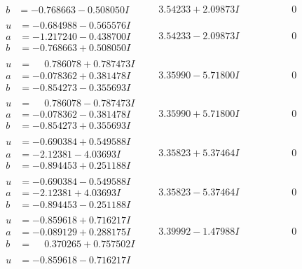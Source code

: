 \documentclass[1p]{elsarticle_modified}
\theoremstyle{definition}
\begin{document}
$$\begin{array}{c|c|c}
\begin{aligned}
b &= -0.768663 - 0.508050 I\end{aligned}
 & \phantom{-}3.54233 + 2.09873 I & \phantom{-0.000000 } 0 \\ \hline\begin{aligned}
u &= -0.684988 - 0.565576 I \\
a &= -1.217240 - 0.438700 I \\
b &= -0.768663 + 0.508050 I\end{aligned}
 & \phantom{-}3.54233 - 2.09873 I & \phantom{-0.000000 } 0 \\ \hline\begin{aligned}
u &= \phantom{-}0.786078 + 0.787473 I \\
a &= -0.078362 + 0.381478 I \\
b &= -0.854273 - 0.355693 I\end{aligned}
 & \phantom{-}3.35990 - 5.71800 I & \phantom{-0.000000 } 0 \\ \hline\begin{aligned}
u &= \phantom{-}0.786078 - 0.787473 I \\
a &= -0.078362 - 0.381478 I \\
b &= -0.854273 + 0.355693 I\end{aligned}
 & \phantom{-}3.35990 + 5.71800 I & \phantom{-0.000000 } 0 \\ \hline\begin{aligned}
u &= -0.690384 + 0.549588 I \\
a &= -2.12381 - 4.03693 I \\
b &= -0.894453 + 0.251188 I\end{aligned}
 & \phantom{-}3.35823 + 5.37464 I & \phantom{-0.000000 } 0 \\ \hline\begin{aligned}
u &= -0.690384 - 0.549588 I \\
a &= -2.12381 + 4.03693 I \\
b &= -0.894453 - 0.251188 I\end{aligned}
 & \phantom{-}3.35823 - 5.37464 I & \phantom{-0.000000 } 0 \\ \hline\begin{aligned}
u &= -0.859618 + 0.716217 I \\
a &= -0.089129 + 0.288175 I \\
b &= \phantom{-}0.370265 + 0.757502 I\end{aligned}
 & \phantom{-}3.39992 - 1.47988 I & \phantom{-0.000000 } 0 \\ \hline\begin{aligned}
u &= -0.859618 - 0.716217 I \\

\end{aligned}
\end{array}$$
\end{document}
